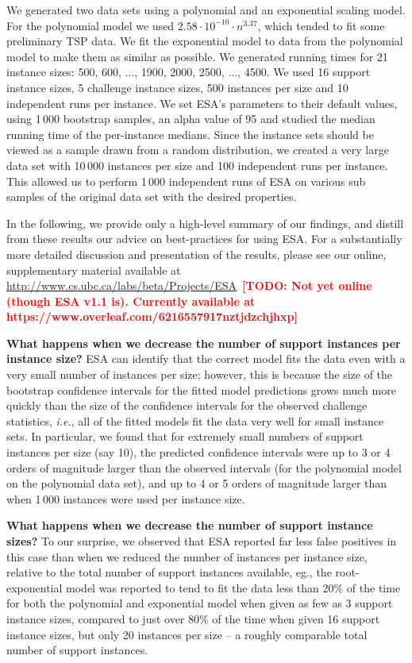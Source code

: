\documentclass[aic]{iosart2x}
\newcommand{\ie}{\emph{i.e.}}
\newcommand{\todo}[1]{\textcolor{red}{\bf [TODO: #1]}}
\begin{document}
We generated two data sets using a polynomial and an exponential scaling model. For the polynomial model we used $2.58\cdot 10^{-10} \cdot n^{3.37}$, which tended to fit some preliminary TSP data. We fit the exponential model to data from the polynomial model to make them as similar as possible. We generated running times for 21 instance sizes: 500, 600, ..., 1900, 2000, 2500, ..., 4500. We used 16 support instance sizes, 5 challenge instance sizes, 500 instances per size and 10 independent runs per instance. We set ESA's parameters to their default values, using 1\,000 bootstrap samples, an alpha value of 95 and studied the median running time of the per-instance medians. 
Since the instance sets should be viewed as a sample drawn from a random distribution, we created a very large data set with 10\,000 instances per size and 100 independent runs per instance. This allowed us to perform 1\,000 independent runs of ESA on various sub samples of the original data set with the desired properties.

In the following, we provide only a high-level summary of our findings, and distill from these results our advice on best-practices for using ESA. For a substantially more detailed discussion and presentation of the results, please see our online, supplementary material available at \url{http://www.cs.ubc.ca/labs/beta/Projects/ESA}~\todo{Not yet online (though ESA v1.1 is). Currently available at https://www.overleaf.com/6216557917nztjdzchjhxp}

\textbf{What happens when we decrease the number of support instances per instance size?}
ESA can identify that the correct model fits the data even with a very small number of instances per size; however, this is because the size of the bootstrap confidence intervals for the fitted model predictions grows much more quickly than the size of the confidence intervals for the observed challenge statistics, \ie{}, all of the fitted models fit the data very well for small instance sets. In particular, we found that for extremely small numbers of support instances per size (say 10), the predicted confidence intervals were up to 3 or 4 orders of magnitude larger than the observed intervals (for the polynomial model on the polynomial data set), and up to 4 or 5 orders of magnitude larger than when 1\,000 instances were used per instance size.

\textbf{What happens when we decrease the number of support instance sizes?}
To our surprise, we observed that ESA reported far less false positives in this case than when we reduced the number of instances per instance size, relative to the total number of support instances available, eg., the root-exponential model was reported to tend to fit the data less than 20\% of the time for both the polynomial and exponential model when given as few as 3 support instance sizes, compared to just over 80\% of the time when given 16 support instance sizes, but only 20 instances per size -- a roughly comparable total number of support instances.
\end{document}

